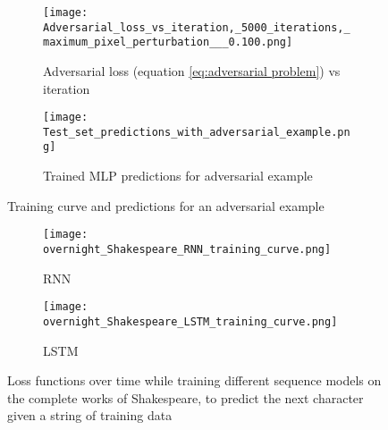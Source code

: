 \begin{figure}
    \centering
    \begin{subfigure}{0.6\textwidth}
        \centering
        \texttt{[image: Adversarial\_loss\_vs\_iteration,\_5000\_iterations,\_maximum\_pixel\_perturbation\_\_\_0.100.png]}
        \caption{Adversarial loss (equation \ref{eq:adversarial problem}) vs iteration}
        \label{fig:adversarial loss}
    \end{subfigure}
    \newline
    \begin{subfigure}{\textwidth}
        \centering
        \texttt{[image: Test\_set\_predictions\_with\_adversarial\_example.png]}
        \caption{Trained MLP predictions for adversarial example}
        \label{fig:adversarial prediction}
    \end{subfigure}
    \caption{Training curve and predictions for an adversarial example}
    \label{fig:adversarial example}
\end{figure}
\begin{figure}
    \centering
    \begin{subfigure}{0.45\textwidth}
        \centering
        \texttt{[image: overnight\_Shakespeare\_RNN\_training\_curve.png]}
        \caption{RNN}
        \label{fig:Shakespeare RNN}
    \end{subfigure}
    \begin{subfigure}{0.45\textwidth}
        \centering
        \texttt{[image: overnight\_Shakespeare\_LSTM\_training\_curve.png]}
        \caption{LSTM}
        \label{fig:Shakespeare LSTM}
    \end{subfigure}
    \caption{Loss functions over time while training different sequence models on the complete works of Shakespeare, to predict the next character given a string of training data}
    \label{fig:Shakespeare}
\end{figure}

